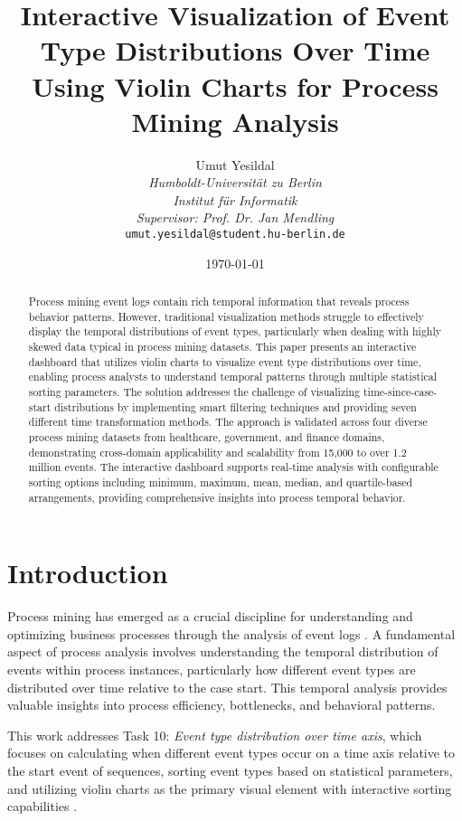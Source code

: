 \documentclass[11pt,a4paper]{article}
\title{Interactive Visualization of Event Type Distributions Over Time Using Violin Charts for Process Mining Analysis}
\author{
    Umut Yesildal \\
    \textit{Humboldt-Universität zu Berlin} \\
    \textit{Institut für Informatik} \\
    \textit{Supervisor: Prof. Dr. Jan Mendling} \\
    \texttt{umut.yesildal@student.hu-berlin.de}
}
\date{\today}
\begin{document}
\maketitle

\begin{abstract}
Process mining event logs contain rich temporal information that reveals process behavior patterns. However, traditional visualization methods struggle to effectively display the temporal distributions of event types, particularly when dealing with highly skewed data typical in process mining datasets. This paper presents an interactive dashboard that utilizes violin charts to visualize event type distributions over time, enabling process analysts to understand temporal patterns through multiple statistical sorting parameters. The solution addresses the challenge of visualizing time-since-case-start distributions by implementing smart filtering techniques and providing seven different time transformation methods. The approach is validated across four diverse process mining datasets from healthcare, government, and finance domains, demonstrating cross-domain applicability and scalability from 15,000 to over 1.2 million events. The interactive dashboard supports real-time analysis with configurable sorting options including minimum, maximum, mean, median, and quartile-based arrangements, providing comprehensive insights into process temporal behavior.
\end{abstract}

\section{Introduction}
\label{sec:introduction}

Process mining has emerged as a crucial discipline for understanding and optimizing business processes through the analysis of event logs \cite{aalst2016process}. A fundamental aspect of process analysis involves understanding the temporal distribution of events within process instances, particularly how different event types are distributed over time relative to the case start. This temporal analysis provides valuable insights into process efficiency, bottlenecks, and behavioral patterns.

This work addresses Task 10: \textit{Event type distribution over time axis}, which focuses on calculating when different event types occur on a time axis relative to the start event of sequences, sorting event types based on statistical parameters, and utilizing violin charts as the primary visual element with interactive sorting capabilities \cite{chen2015survey}.
\end{document}
